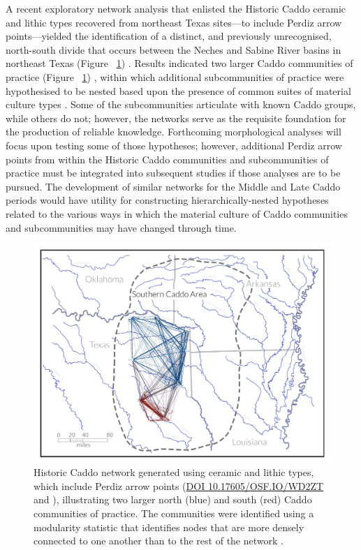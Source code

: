 \documentclass[review]{elsarticle}
\begin{document}
A recent exploratory network analysis that enlisted the Historic Caddo ceramic and lithic types recovered from northeast Texas sites---to include Perdiz arrow points---yielded the identification of a distinct, and previously unrecognised, north-south divide that occurs between the Neches and Sabine River basins in northeast Texas (Figure ~\ref{fig:fig.net}) \citep{RN8031}. Results indicated two larger Caddo communities of practice (Figure ~\ref{fig:fig.net}) \citep[Figure 16.4]{RN8031}, within which additional subcommunities of practice were hypothesised to be nested based upon the presence of common suites of material culture types \citep[Figures 16.5 and 16.6]{RN8031}. Some of the subcommunities articulate with known Caddo groups, while others do not; however, the networks serve as the requisite foundation for the production of reliable knowledge. Forthcoming morphological analyses will focus upon testing some of those hypotheses; however, additional Perdiz arrow points from within the Historic Caddo communities and subcommunities of practice must be integrated into subsequent studies if those analyses are to be pursued. The development of similar networks for the Middle and Late Caddo periods would have utility for constructing hierarchically-nested hypotheses related to the various ways in which the material culture of Caddo communities and subcommunities may have changed through time.

\begin{figure}[!]\centering
\includegraphics[width=\linewidth]{fig.net.pdf}
\caption{Historic Caddo network generated using ceramic and lithic types, which include Perdiz arrow points (\href{https://osf.io/wd2zt/}{DOI 10.17605/OSF.IO/WD2ZT} and \citealt{RN8031}), illustrating two larger north (blue) and south (red) Caddo communities of practice. The communities were identified using a modularity statistic that identifies nodes that are more densely connected to one another than to the rest of the network \citep{RN8051,RN8024}.}
\label{fig:fig.net}
\end{figure}
\end{document}
